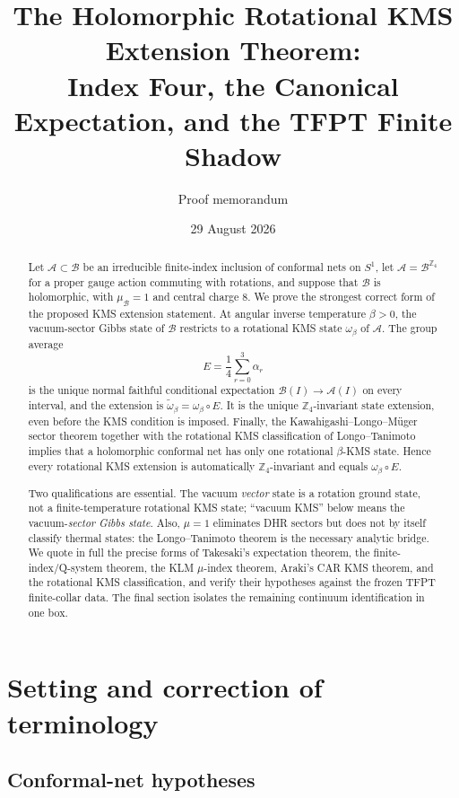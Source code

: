 \documentclass[11pt]{article}
\title{The Holomorphic Rotational KMS Extension Theorem:\\
Index Four, the Canonical Expectation, and the TFPT Finite Shadow}
\author{Proof memorandum}
\date{29 August 2026}
\theoremstyle{remark}
\newcommand{\A}{\mathcal A}
\newcommand{\B}{\mathcal B}
\newcommand{\Z}{\mathbb Z}
\begin{document}
\maketitle

\begin{abstract}
Let $\A\subset\B$ be an irreducible finite-index inclusion of conformal
nets on $S^1$, let $\A=\B^{\Z_4}$ for a proper gauge action commuting
with rotations, and suppose that $\B$ is holomorphic, with
$\mu_{\B}=1$ and central charge $8$.  We prove the strongest correct
form of the proposed KMS extension statement.  At angular inverse
temperature $\beta>0$, the vacuum-sector Gibbs state of $\B$ restricts
to a rotational KMS state $\omega_\beta$ of $\A$.  The group average
\[
 E=\frac14\sum_{r=0}^{3}\alpha_r
\]
is the unique normal faithful conditional expectation
$\B(I)\to\A(I)$ on every interval, and the extension is
$\widetilde\omega_\beta=\omega_\beta\circ E$.  It is the unique
$\Z_4$-invariant state extension, even before the KMS condition is
imposed.  Finally, the Kawahigashi--Longo--M\"uger sector theorem
together with the rotational KMS classification of
Longo--Tanimoto implies that a holomorphic conformal net has only one
rotational $\beta$-KMS state.  Hence every rotational KMS extension is
automatically $\Z_4$-invariant and equals
$\omega_\beta\circ E$.

Two qualifications are essential.  The vacuum \emph{vector} state is
a rotation ground state, not a finite-temperature rotational KMS
state; ``vacuum KMS'' below means the vacuum-\emph{sector Gibbs
state}.  Also, $\mu=1$ eliminates DHR sectors but does not by itself
classify thermal states: the Longo--Tanimoto theorem is the necessary
analytic bridge.  We quote in full the precise forms of Takesaki's
expectation theorem, the finite-index/Q-system theorem, the KLM
$\mu$-index theorem, Araki's CAR KMS theorem, and the rotational KMS
classification, and verify their hypotheses against the frozen TFPT
finite-collar data.  The final section isolates the remaining
continuum identification in one box.
\end{abstract}

\tableofcontents

\section{Setting and correction of terminology}

\subsection{Conformal-net hypotheses}
\end{document}
